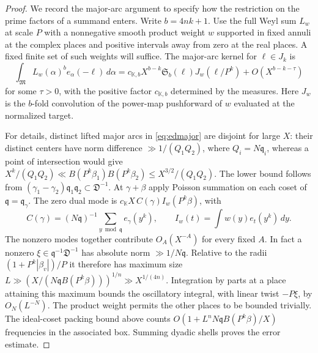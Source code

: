 \documentclass[11pt,letterpaper]{article}
\theoremstyle{definition}
\numberwithin{equation}{section}
\begin{document}
\begin{proof}
We record the major-arc argument to specify how the restriction on the
prime factors of a summand enters. Write $b=4nk+1$. Use the full Weyl
sum $L_w$ at scale $P$ with a nonnegative smooth product weight $w$
supported in fixed annuli at the complex places and positive intervals
away from zero at the real places. A fixed finite set of such weights
will suffice. The major-arc kernel for $\ell\in J_k$ is
\begin{equation}\label{eq:edkernel}
 \int_{\mathfrak M}L_w(\alpha)^b e_\alpha(-\ell)\,d\alpha
 = c_{\mathbb K,b}X^{b-k}
       \mathfrak S_b(\ell)J_w(\ell/P^k)+O(X^{b-k-\tau})
\end{equation}
for some $\tau>0$, with the positive factor $c_{\mathbb K,b}$
determined by the measures. Here $J_w$ is the $b$-fold convolution of
the power-map pushforward of $w$ evaluated at the normalized target.

For details, distinct lifted major arcs in \eqref{eq:edmajor} are
disjoint for large $X$: their distinct centers have norm difference
$\gg 1/(Q_1Q_2)$, where $Q_i=N\mathfrak q_i$, whereas a point of
intersection would give
$X^k/(Q_1Q_2)\ll B(P^k\beta_1)B(P^k\beta_2)\le
 X^{3/2}/(Q_1Q_2)$. The lower bound follows from
$(\gamma_1-\gamma_2)\mathfrak q_1\mathfrak q_2\subset\mathfrak D^{-1}$.
At $\gamma+\beta$ apply Poisson summation on each coset of
$\mathfrak q=\mathfrak q_\gamma$. The zero dual mode is
$c_{\mathbb K}X\,C(\gamma)I_w(P^k\beta)$, with
\[
 C(\gamma)=(N\mathfrak q)^{-1}
              \sum_{y\bmod\mathfrak q}e_\gamma(y^k),
 \qquad I_w(t)=\int w(y)e_t(y^k)\,dy.
\]
The nonzero modes together contribute $O_A(X^{-A})$ for every fixed
$A$. In fact a nonzero $\xi\in\mathfrak q^{-1}\mathfrak D^{-1}$ has
absolute norm $\gg 1/N\mathfrak q$. Relative to the radii
$(1+P^k|\beta_v|)/P$ it therefore has maximum size
$L\gg (X/(N\mathfrak q B(P^k\beta)))^{1/n}\gg X^{1/(4n)}$.
Integration by parts at a place attaining this maximum bounds the
oscillatory integral, with linear twist $-P\xi$, by $O_N(L^{-N})$.
The product weight permits the other places to be bounded trivially.
The ideal-coset packing bound above counts
$O(1+L^n N\mathfrak q B(P^k\beta)/X)$ frequencies in the associated
box. Summing dyadic shells proves the error estimate.


\end{proof}
\end{document}
